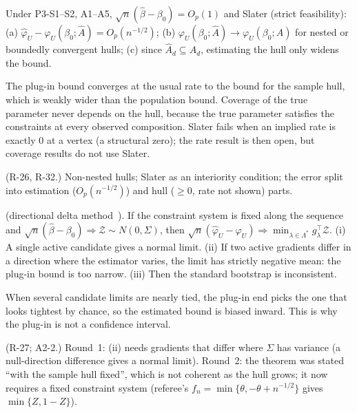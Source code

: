 \begin{result}\label{res:p32}
 Under P3-S1--S2, A1--A5, $\sqrt n(\hat\beta-\beta_0)=O_p(1)$ and
Slater (strict feasibility): (a) $\hat\varphi_U-\varphi_U(\beta_0;\hat A)=O_p(n^{-1/2})$;
(b) $\varphi_U(\beta_0;\hat A)\to\varphi_U(\beta_0;A)$ for nested or boundedly
convergent hulls; (c) since $\hat A_d\subseteq A_d$, estimating the hull only widens
the bound.
\end{result}
\begin{plain}
The plug-in bound converges at the usual rate to the bound for the sample hull,
which is weakly wider than the population bound. Coverage of the true parameter
never depends on the hull, because the true parameter satisfies the constraints at
every observed composition. Slater fails when an implied rate is exactly 0 at a
vertex (a structural zero); the rate result is then open, but coverage results do
not use Slater.
\end{plain}
\begin{revnote}(R-26, R-32.) Non-nested hulls; Slater as an interiority condition; the error split into estimation ($O_p(n^{-1/2})$) and hull ($\ge0$, rate not shown) parts.\end{revnote}

\begin{result}\label{res:p34}
 (directional delta method~\citep{fangsantos2019}).
If the constraint system is fixed along the sequence and
$\sqrt n(\hat\beta-\beta_0)\Rightarrow\mathcal Z\sim N(0,\Sigma)$, then
$\sqrt n(\hat\varphi_U-\varphi_U)\Rightarrow\min_{\lambda\in\Lambda^*}g_\lambda^\top\mathcal Z$.
(i) A single active candidate gives a normal limit. (ii) If two active gradients
differ in a direction where the estimator varies, the limit has strictly negative
mean: the plug-in bound is too narrow. (iii) Then the standard bootstrap is
inconsistent.
\end{result}
\begin{plain}
When several candidate limits are nearly tied, the plug-in end picks the one that
looks tightest by chance, so the estimated bound is biased inward. This is why the
plug-in is not a confidence interval.
\end{plain}
\begin{revnote}
(R-27; A2-2.) Round~1: (ii) needs gradients that differ where $\Sigma$ has
variance (a null-direction difference gives a normal limit). Round~2: the theorem
was stated ``with the sample hull fixed'', which is not coherent as the hull grows;
it now requires a fixed constraint system (referee's $f_n=\min\{\theta,-\theta+n^{-1/2}\}$
gives $\min\{Z,1-Z\}$).
\end{revnote}

